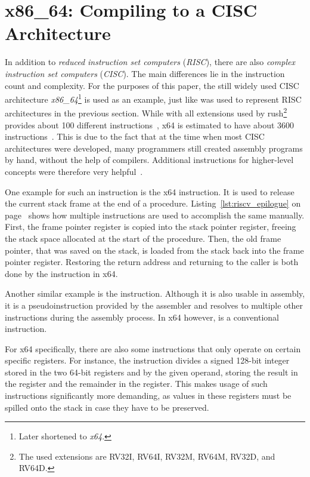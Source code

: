 \newpage
\section{x86\_64: Compiling to a CISC Architecture}

In addition to \emph{reduced instruction set computers} (\emph{RISC}), there are also \emph{complex instruction set computers} (\emph{CISC}).
The main differences lie in the instruction count and complexity.
For the purposes of this paper, the still widely used CISC architecture \emph{x86\_64}\footnote{Later shortened to \emph{x64}.} is used as an example, just like \riscv{} was used to represent RISC architectures in the previous section.
While \riscv{} with all extensions used by rush\footnote{The used extensions are RV32I, RV64I, RV32M, RV64M, RV32D, and RV64D.} provides about 100 different instructions~\cite[Chapter~24]{Waterman2019}, x64 is estimated to have about 3600 instructions~\cite{Rodgers2017}.
This is due to the fact that at the time when most CISC architectures were developed, many programmers still created assembly programs by hand, without the help of compilers.
Additional instructions for higher-level concepts were therefore very helpful~\cite[p.~9]{Dandamudi2005Risc}.

One example for such an instruction is the x64  instruction.
It is used to release the current stack frame at the end of a procedure.
Listing~\ref{lst:riscv_epilogue} on page~\pageref{lst:riscv_epilogue} shows how multiple \riscv{} instructions are used to accomplish the same manually.
First, the frame pointer register is copied into the stack pointer register, freeing the stack space allocated at the start of the procedure.
Then, the old frame pointer, that was saved on the stack, is loaded from the stack back into the frame pointer register.
Restoring the return address and returning to the caller is both done by the  instruction in x64.

Another similar example is the  instruction.
Although it is also usable in \riscv{} assembly, it is a pseudoinstruction provided by the assembler and resolves to multiple other \riscv{} instructions during the assembly process.
In x64 however,  is a conventional instruction.

For x64 specifically, there are also some instructions that only operate on certain specific registers.
For instance, the \label{x64_idiv} instruction divides a signed 128-bit integer stored in the two 64-bit registers  and  by the given operand, storing the result in the  register and the remainder in the  register. This makes usage of such instructions significantly more demanding, as values in these registers must be spilled onto the stack in case they have to be preserved.

